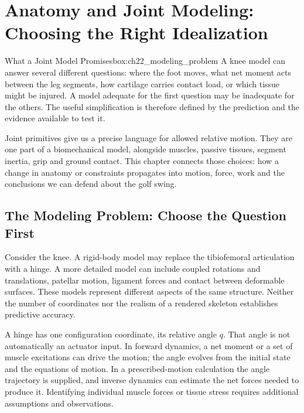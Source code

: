 
\chapter[Anatomy and Joint Modeling: Choosing the Right Idealization]{Anatomy and Joint Modeling:\\Choosing the Right Idealization}
\label{ch:anatomy_joint_modeling}

\begin{laymansbox}{What a Joint Model Promises}{box:ch22_modeling_problem}
A knee model can answer several different questions: where the foot moves, what net moment acts between the leg segments, how cartilage carries contact load, or which tissue might be injured. A model adequate for the first question may be inadequate for the others. The useful simplification is therefore defined by the prediction and the evidence available to test it.

Joint primitives give us a precise language for allowed relative motion. They are one part of a biomechanical model, alongside muscles, passive tissues, segment inertia, grip and ground contact. This chapter connects those choices: how a change in anatomy or constraints propagates into motion, force, work and the conclusions we can defend about the golf swing.
\end{laymansbox}

\section{The Modeling Problem: Choose the Question First}\label{sec-modeling_problem}\label{sec:modeling_problem}

Consider the knee. A rigid-body model may replace the tibiofemoral articulation with a hinge. A more detailed model can include coupled rotations and translations, patellar motion, ligament forces and contact between deformable surfaces. These models represent different aspects of the same structure. Neither the number of coordinates nor the realism of a rendered skeleton establishes predictive accuracy.

A hinge has one configuration coordinate, its relative angle \(q\). That angle is not automatically an actuator input. In forward dynamics, a net moment or a set of muscle excitations can drive the motion; the angle evolves from the initial state and the equations of motion. In a prescribed-motion calculation the angle trajectory is supplied, and inverse dynamics can estimate the net forces needed to produce it. Identifying individual muscle forces or tissue stress requires additional assumptions and observations.


